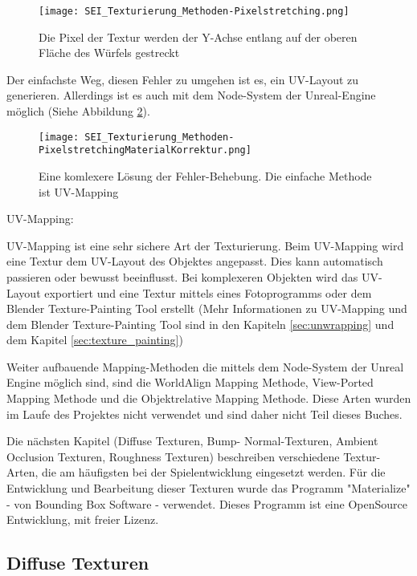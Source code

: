 \begin{figure}[h]
    \centering
    \texttt{[image: SEI\_Texturierung\_Methoden-Pixelstretching.png]}
    \caption{Die Pixel der Textur werden der Y-Achse entlang auf der oberen Fläche des Würfels gestreckt}
    \label{picture:tex_streching}
\end{figure}

Der einfachste Weg, diesen Fehler zu umgehen ist es, ein UV-Layout zu generieren. Allerdings ist es auch mit dem
Node-System der Unreal-Engine\citep{ue:node_introduction} möglich (Siehe Abbildung \ref{picture:tex_streching_solve}).


\begin{figure}[h]
    \centering
    \texttt{[image: SEI\_Texturierung\_Methoden-PixelstretchingMaterialKorrektur.png]}
    \caption{Eine komlexere Lösung der Fehler-Behebung. Die einfache Methode ist UV-Mapping}
    \label{picture:tex_streching_solve}
\end{figure}


UV-Mapping:

UV-Mapping ist eine sehr sichere Art der Texturierung. Beim UV-Mapping wird eine Textur dem UV-Layout des Objektes
angepasst. Dies kann automatisch passieren oder bewusst beeinflusst. Bei komplexeren Objekten wird das UV-Layout
exportiert und eine Textur mittels eines Fotoprogramms oder dem Blender Texture-Painting Tool erstellt
(Mehr Informationen zu UV-Mapping und dem Blender Texture-Painting Tool sind in den Kapiteln \ref{sec:unwrapping} und
dem Kapitel \ref{sec:texture_painting})


Weiter aufbauende Mapping-Methoden die mittels dem Node-System der Unreal Engine möglich sind, sind die WorldAlign
Mapping Methode, View-Ported Mapping Methode und die Objektrelative Mapping Methode. Diese Arten wurden im Laufe
des Projektes nicht verwendet und sind daher nicht Teil dieses Buches.

Die nächsten Kapitel (Diffuse Texturen, Bump- Normal-Texturen, Ambient Occlusion Texturen, Roughness Texturen)
beschreiben verschiedene Textur-Arten, die am häufigsten bei der Spielentwicklung eingesetzt werden. Für die
Entwicklung und Bearbeitung dieser Texturen wurde das Programm "Materialize" - von Bounding Box
Software\citep{bbs:materialize} - verwendet. Dieses Programm ist eine OpenSource Entwicklung, mit freier Lizenz.


\subsection{Diffuse Texturen}
\label{sec:tex_diffuse}

